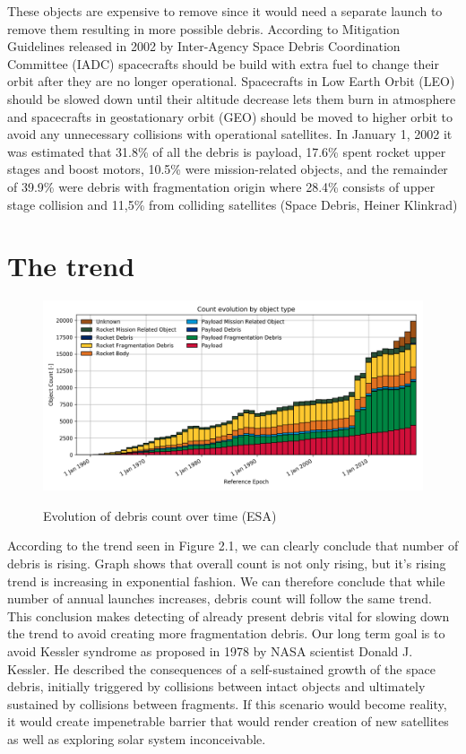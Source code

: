 \documentclass[12pt, a4paper, oneside]{book}
\begin{document}
These objects are expensive to remove since it would need a separate launch to remove them resulting in more possible debris.
According to Mitigation Guidelines released in 2002 by Inter-Agency Space Debris Coordination Committee (IADC) spacecrafts should be build with extra fuel to change their orbit after they are no longer operational.
Spacecrafts in Low Earth Orbit (LEO) should be slowed down until their altitude decrease lets them burn in atmosphere and spacecrafts in geostationary orbit (GEO) should be moved to higher orbit to avoid any unnecessary collisions with operational satellites.
In January 1, 2002 it was estimated that 31.8\% of all the debris is payload, 17.6\% spent rocket upper stages and boost motors, 10.5\% were mission-related objects, and the remainder of 39.9\% were debris with fragmentation origin where 28.4\% consists of upper stage collision and 11,5\% from colliding satellites (Space Debris, Heiner Klinkrad)

\section{The trend}


\begin{figure}[!hbt]
    \begin{center}
        \includegraphics[scale=0.60]{images/debris_count.png}
        \label{img:debris_count}
        \caption{Evolution of debris count over time (ESA)}
    \end{center}
\end{figure}

According to the trend seen in Figure 2.1, we can clearly conclude that number of debris is rising.
Graph shows that overall count is not only rising, but it's rising trend is increasing in exponential fashion.
We can therefore conclude that while number of annual launches increases, debris count will follow the same trend.
This conclusion makes detecting of already present debris vital for slowing down the trend to avoid creating more fragmentation debris.
Our long term goal is to avoid Kessler syndrome as proposed in 1978 by NASA scientist Donald J. Kessler.
He described the consequences of a self-sustained growth of the space debris, initially triggered by collisions between intact objects and ultimately sustained by collisions between fragments.
If this scenario would become reality, it would create impenetrable barrier that would render creation of new satellites as well as exploring solar system inconceivable.
\end{document}
